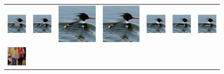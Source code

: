 \begin{figure}[!ht]
\centering
\setlength\tabcolsep{1pt}
\begin{tabular}{ccccccc}
\includegraphics[width=.14\textwidth]{figures/imagenet/imagenet_0011_input_image.jpg}&
\includegraphics[width=.14\textwidth]{figures/imagenet/imagenet_0011_pm.jpg}&
\includegraphics[width=.14\textwidth]{figures/imagenet/0011_ce2.jpg}&
\includegraphics[width=.14\textwidth]{figures/imagenet/0011_nps2.jpg}&
\includegraphics[width=.14\textwidth]{figures/imagenet/imagenet_0011_siggraph2017.jpg}&
\includegraphics[width=.14\textwidth]{figures/imagenet/imagenet_0011_g.jpg}&
\includegraphics[width=.14\textwidth]{figures/imagenet/imagenet_0011_synthesized_image.jpg}\\
\includegraphics[width=.14\textwidth]{figures/imagenet/imagenet_0034_input_image.jpg}&

\end{tabular}
\end{figure}
